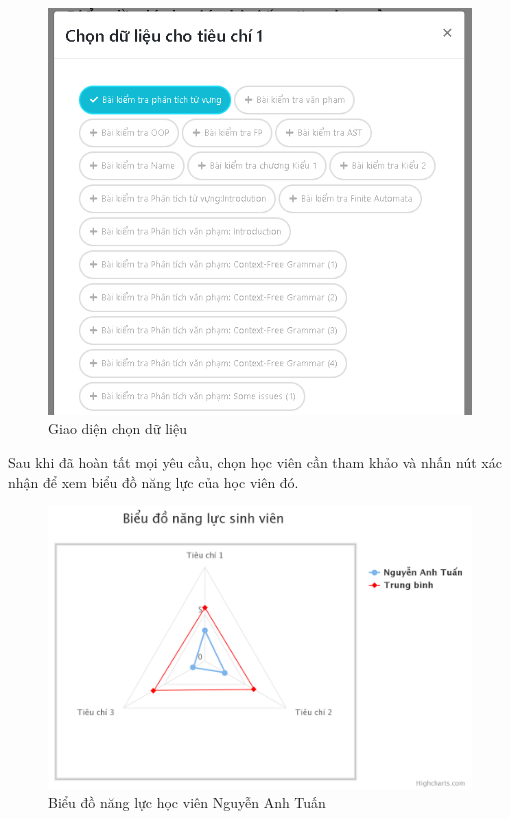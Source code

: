\begin{center}
	\begin{figure}[htp]
		\begin{center}
			\includegraphics[width=0.5\linewidth]{img/21}
		\end{center}
		\caption{Giao diện chọn dữ liệu}
		\label{refhinh53}
	\end{figure}
\end{center}

\newpage
Sau khi đã hoàn tất mọi yêu cầu, chọn học viên cần tham khảo và nhấn nút xác nhận để xem biểu đồ năng lực của học viên đó.

\begin{center}
	\begin{figure}[htp]
		\begin{center}
			\includegraphics[width=1\linewidth]{img/22}
		\end{center}
		\caption{Biểu đồ năng lực học viên Nguyễn Anh Tuấn}
		\label{refhinh54}
	\end{figure}
\end{center}

